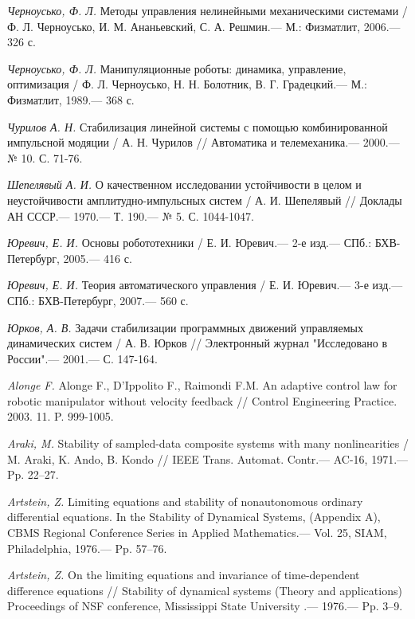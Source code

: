 \begin{thebibliography}{10}
	{\it Черноусько, Ф. Л.} Методы управления нелинейными механическими системами /
	Ф. Л. Черноусько, И. М. Ананьевский, С. А. Решмин.— М.: Физматлит, 2006.— 326 с.
	
	{\it Черноусько, Ф. Л.} Манипуляционные роботы: динамика, управление, оптимизация /
	Ф. Л. Черноусько, Н. Н. Болотник, В. Г. Градецкий.— М.: Физматлит, 1989.— 368 с.
	
	{\it Чурилов А. Н.} Стабилизация линейной системы с помощью комбинированной импульсной модяции /
	А. Н. Чурилов // Автоматика и телемеханика.— 2000.— № 10. С. 71-76.
	
	{\it Шепелявый А. И.} О качественном исследовании устойчивости в целом и неустойчивости амплитудно-импульсных систем /
	А. И. Шепелявый // Доклады АН СССР.— 1970.— Т. 190.— № 5. С. 1044-1047.
	
	
	{\it Юревич, Е. И.} Основы робототехники / Е. И. Юревич.— 2-е изд.— СПб.:
	БХВ-Петербург, 2005.— 416 с.
	
	{\it Юревич, Е. И.} Теория автоматического управления / Е. И. Юревич.— 3-е изд.— СПб.:
	БХВ-Петербург, 2007.— 560 с.
	
	{\it Юрков, А. В.} Задачи стабилизации программных движений управляемых динамических систем / А. В. Юрков // Электронный журнал "Исследовано в России".— 2001.— С. 147-164.
	
	{\it Alonge F.} Alonge F., D’Ippolito F., Raimondi F.M. An adaptive control law for robotic manipulator without velocity feedback // Control Engineering Practice. 2003. 11. P. 999-1005.
	
	{\it Araki, M.} Stability of sampled-data composite systems with many nonlinearities / M. Araki, K. Ando, B. Kondo // IEEE Trans. Automat. Contr.— AC-16, 1971.— Pp. 22–27.
	
	{\it Artstein, Z.} Limiting equations and stability of nonautonomous ordinary differential equations. In the Stability of Dynamical Systems, (Appendix A), CBMS Regional Conference Series in Applied Mathematics.— Vol. 25, SIAM, Philadelphia, 1976.— Pp. 57–76.
	
	{\it Artstein, Z.} On the limiting equations and invariance of time-dependent difference equations // Stability of dynamical systems (Theory and applications) Proceedings of NSF conference, Mississippi State University .— 1976.— Pp. 3–9.
	

\end{thebibliography}
